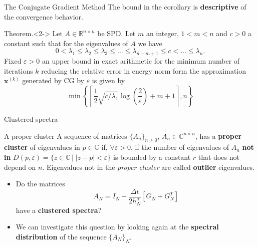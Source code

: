 \documentclass[aspectratio=169,xcolor=dvipsnames]{beamer}
\begin{document}
\begin{frame}{The Conjugate Gradient Method}
\alert{\faExclamationTriangle} The bound in the corollary is \textbf{descriptive} of the convergence behavior.

\begin{alertblock}{Theorem.}<2->
Let $A \in \mathbb{R}^{n \times n}$ be SPD. Let $m$ an integer,
$1<m<n$ and $c>0$ a constant such that for the eigenvalues of $A$ we
have 
$$
0<\lambda_1\leq \lambda_2\leq \lambda_3\leq \ldots \leq
\lambda_{n-m+1} \leq c < \ldots \leq \lambda_n.
$$
Fixed $\varepsilon>0$ an upper bound in exact arithmetic
for the minimum number of iterations $k$ reducing the relative error
in energy norm form the approximation $\mathbf{x}^{(k)}$ generated by CG by
$\varepsilon$ is given by
\begin{equation*}
	\min \left\{ \left\lceil \frac12 \sqrt{c/\lambda_1} \log{\left(
		\frac{2}{\varepsilon} \right)}+m+1\right\rceil,n \right\}
\end{equation*}
\end{alertblock}


\end{frame}

\begin{frame}{Clustered spectra}

\begin{block}{A proper cluster}
	    A sequence of matrices $\{A_n\}_{n \geq 0}$, $A_n \in
	\mathbb{C}^{n \times
		n}$, has a \textbf{proper cluster} of eigenvalues in $p \in
	\mathbb{C}$
	if, $\forall \varepsilon > 0$, if the number of eigenvalues of
	$A_n$
	\textbf{not in} $D(p,\varepsilon) = \{z \in \mathbb{C}\,|\;
	|z-p|<\varepsilon\}$ is
	bounded by a constant $r$ that does not depend on $n$. Eigenvalues
	not in the \emph{proper cluster} are called \textbf{outlier}
	eigenvalues.
\end{block}

\begin{itemize}
	\item[\faQuestionCircle]<2-> Do the matrices
	\[
	A_N = I_N - \frac{\Delta t}{2 h_N^\alpha} \left[ G_N + G_N^T \right]
	\]
	have a \textbf{clustered spectra}?
	\item[\faEye]<3-> We can investigate this question by looking again at the \alert{\textbf{spectral distribution}} of the sequence $\{A_N\}_N$.
\end{itemize}

\end{frame}
\end{document}
